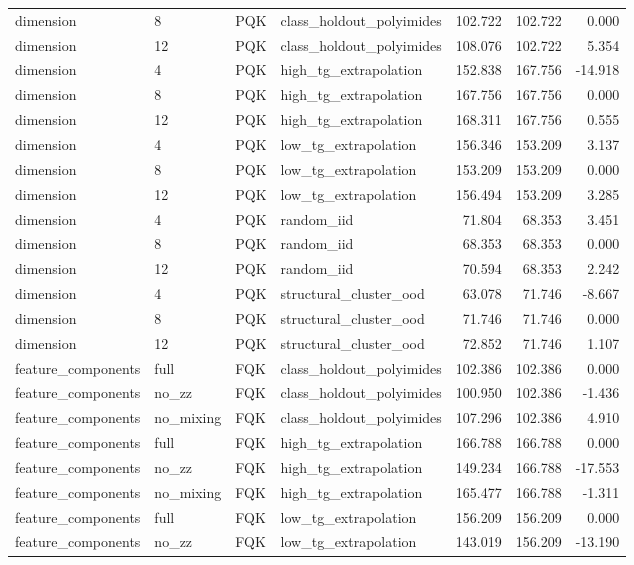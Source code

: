 \begin{tabular}{llllrrr}
dimension & 8 & PQK & class\_holdout\_polyimides & 102.722 & 102.722 & 0.000 \\
dimension & 12 & PQK & class\_holdout\_polyimides & 108.076 & 102.722 & 5.354 \\
dimension & 4 & PQK & high\_tg\_extrapolation & 152.838 & 167.756 & -14.918 \\
dimension & 8 & PQK & high\_tg\_extrapolation & 167.756 & 167.756 & 0.000 \\
dimension & 12 & PQK & high\_tg\_extrapolation & 168.311 & 167.756 & 0.555 \\
dimension & 4 & PQK & low\_tg\_extrapolation & 156.346 & 153.209 & 3.137 \\
dimension & 8 & PQK & low\_tg\_extrapolation & 153.209 & 153.209 & 0.000 \\
dimension & 12 & PQK & low\_tg\_extrapolation & 156.494 & 153.209 & 3.285 \\
dimension & 4 & PQK & random\_iid & 71.804 & 68.353 & 3.451 \\
dimension & 8 & PQK & random\_iid & 68.353 & 68.353 & 0.000 \\
dimension & 12 & PQK & random\_iid & 70.594 & 68.353 & 2.242 \\
dimension & 4 & PQK & structural\_cluster\_ood & 63.078 & 71.746 & -8.667 \\
dimension & 8 & PQK & structural\_cluster\_ood & 71.746 & 71.746 & 0.000 \\
dimension & 12 & PQK & structural\_cluster\_ood & 72.852 & 71.746 & 1.107 \\
feature\_components & full & FQK & class\_holdout\_polyimides & 102.386 & 102.386 & 0.000 \\
feature\_components & no\_zz & FQK & class\_holdout\_polyimides & 100.950 & 102.386 & -1.436 \\
feature\_components & no\_mixing & FQK & class\_holdout\_polyimides & 107.296 & 102.386 & 4.910 \\
feature\_components & full & FQK & high\_tg\_extrapolation & 166.788 & 166.788 & 0.000 \\
feature\_components & no\_zz & FQK & high\_tg\_extrapolation & 149.234 & 166.788 & -17.553 \\
feature\_components & no\_mixing & FQK & high\_tg\_extrapolation & 165.477 & 166.788 & -1.311 \\
feature\_components & full & FQK & low\_tg\_extrapolation & 156.209 & 156.209 & 0.000 \\
feature\_components & no\_zz & FQK & low\_tg\_extrapolation & 143.019 & 156.209 & -13.190 \\

\end{tabular}

